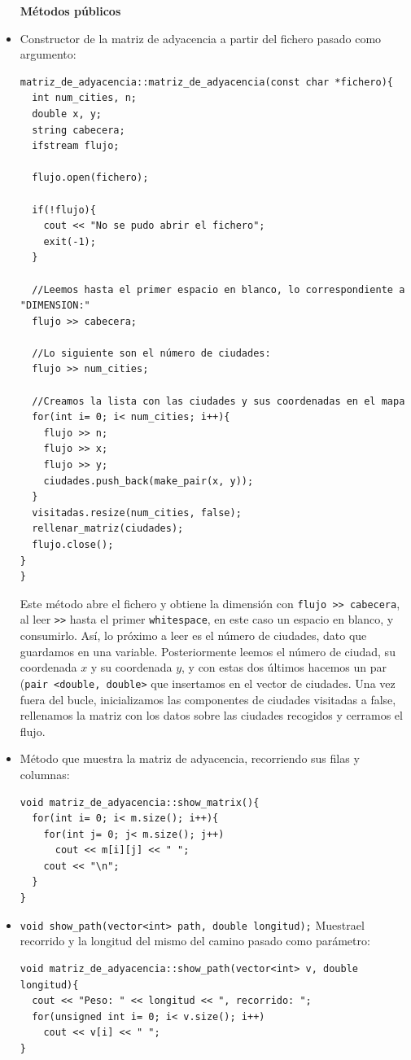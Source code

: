 \documentclass[12pt]{article}
\begin{document}
\begin{itemize}[wide, nosep, labelindent = 0pt, topsep = 1ex]
\item[\textbf{Métodos públicos}] 
\item Constructor de la matriz de adyacencia a partir del fichero pasado como argumento: 
\begin{lstlisting}
matriz_de_adyacencia::matriz_de_adyacencia(const char *fichero){
  int num_cities, n;
  double x, y;
  string cabecera;
  ifstream flujo;

  flujo.open(fichero);

  if(!flujo){
    cout << "No se pudo abrir el fichero";
    exit(-1);
  }

  //Leemos hasta el primer espacio en blanco, lo correspondiente a "DIMENSION:"
  flujo >> cabecera;

  //Lo siguiente son el número de ciudades:
  flujo >> num_cities;

  //Creamos la lista con las ciudades y sus coordenadas en el mapa
  for(int i= 0; i< num_cities; i++){
    flujo >> n;
    flujo >> x;
    flujo >> y;
    ciudades.push_back(make_pair(x, y));
  }
  visitadas.resize(num_cities, false);
  rellenar_matriz(ciudades);
  flujo.close();
}
}
\end{lstlisting}
Este método abre el fichero y obtiene la dimensión con \verb|flujo >> cabecera|, al leer \verb|>>| hasta el primer \verb|whitespace|, en este caso un espacio en blanco, y consumirlo. Así, lo próximo a leer es el número de ciudades, dato que guardamos en una variable. Posteriormente leemos el número de ciudad, su coordenada $x$ y su coordenada $y$, y con estas dos últimos hacemos un par (\verb|pair <double, double>| que insertamos en el vector de ciudades. Una vez fuera del bucle, inicializamos las componentes de ciudades visitadas a false, rellenamos la matriz con los datos sobre las ciudades recogidos y cerramos el flujo.

\item Método que muestra la matriz de adyacencia, recorriendo sus filas y columnas: 
\begin{lstlisting}
void matriz_de_adyacencia::show_matrix(){
  for(int i= 0; i< m.size(); i++){
    for(int j= 0; j< m.size(); j++)
      cout << m[i][j] << " ";
    cout << "\n";
  }
}
\end{lstlisting}

\item \verb|void show_path(vector<int> path, double longitud);| Muestrael recorrido y la longitud del mismo del camino pasado como parámetro:
\begin{lstlisting}
void matriz_de_adyacencia::show_path(vector<int> v, double longitud){
  cout << "Peso: " << longitud << ", recorrido: ";
  for(unsigned int i= 0; i< v.size(); i++)
    cout << v[i] << " ";
}
\end{lstlisting}


\end{itemize}
\end{document}
